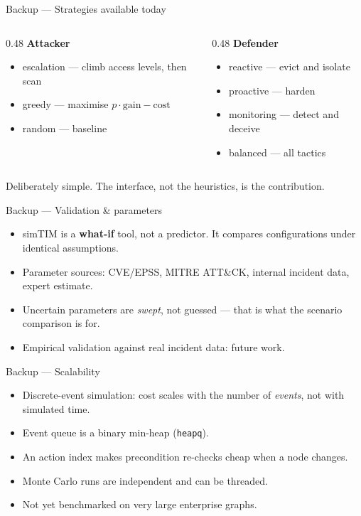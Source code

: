 \begin{frame}{Backup --- Strategies available today}
\small
\begin{columns}[T]
\begin{column}{0.48\textwidth}
\textbf{Attacker}
\begin{itemize}
  \item escalation --- climb access levels, then scan
  \item greedy --- maximise $p\cdot\text{gain} - \text{cost}$
  \item random --- baseline
\end{itemize}
\end{column}
\begin{column}{0.48\textwidth}
\textbf{Defender}
\begin{itemize}
  \item reactive --- evict and isolate
  \item proactive --- harden
  \item monitoring --- detect and deceive
  \item balanced --- all tactics
\end{itemize}
\end{column}
\end{columns}
\vspace{3mm}
Deliberately simple. The interface, not the heuristics, is the contribution.
\end{frame}

\begin{frame}{Backup --- Validation \& parameters}
\small
\begin{itemize}
  \item simTIM is a \textbf{what-if} tool, not a predictor. It compares
        configurations under identical assumptions.
  \item Parameter sources: CVE/EPSS, MITRE ATT\&CK, internal incident data,
        expert estimate.
  \item Uncertain parameters are \emph{swept}, not guessed --- that is what the
        scenario comparison is for.
  \item Empirical validation against real incident data: future work.
\end{itemize}
\end{frame}

\begin{frame}{Backup --- Scalability}
\small
\begin{itemize}
  \item Discrete-event simulation: cost scales with the number of \emph{events},
        not with simulated time.
  \item Event queue is a binary min-heap (\texttt{heapq}).
  \item An action index makes precondition re-checks cheap when a node changes.
  \item Monte Carlo runs are independent and can be threaded.
  \item Not yet benchmarked on very large enterprise graphs.
\end{itemize}
\end{frame}

